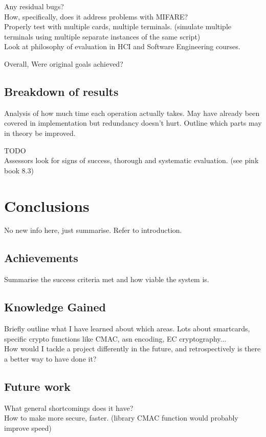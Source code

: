 \documentclass[12pt]{article}
\begin{document}
Any residual bugs?\\

How, specifically, does it address problems with MIFARE?\\

Properly test with multiple cards, multiple terminals. (simulate multiple terminals using multiple separate instances of the same script)\\

Look at philosophy of evaluation in HCI and Software Engineering courses.

Overall, Were original goals achieved?\\

\subsection{Breakdown of results}
Analysis of how much time each operation actually takes. May have already been covered in implementation but redundancy doesn't hurt. Outline which parts may in theory be improved.




TODO\\
Assessors look for signs of success, thorough and systematic evaluation. (see pink book 8.3)\\


\pagebreak



\section{Conclusions}
No new info here, just summarise. Refer to introduction.
\subsection{Achievements}
Summarise the success criteria met and how viable the system is.
\subsection{Knowledge Gained}
Briefly outline what I have learned about which areas. Lots about smartcards, specific crypto functions like CMAC, asn encoding, EC cryptography...\\
How would I tackle a project differently in the future, and retrospectively is there a better way to have done it?
\subsection{Future work}
What general shortcomings does it have?\\
How to make more secure, faster. (library CMAC function would probably improve speed)
\end{document}
